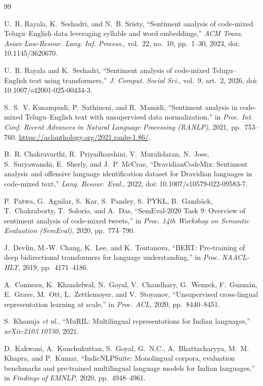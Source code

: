 \documentclass[10pt,journal]{IEEEtran}
\begin{document}
\begin{thebibliography}{99}

U.~R. Rayala, K.~Seshadri, and N.~B. Sristy, ``Sentiment analysis of code-mixed Telugu--English data leveraging syllable and word embeddings,'' \emph{ACM Trans. Asian Low-Resour. Lang. Inf. Process.}, vol.~22, no.~10, pp.~1--30, 2023, doi: 10.1145/3620670.

U.~R. Rayala and K.~Seshadri, ``Sentiment analysis of code-mixed Telugu--English text using transformers,'' \emph{J. Comput. Social Sci.}, vol.~9, art.~2, 2026, doi: 10.1007/s42001-025-00434-3.

S.~S.~V. Kusampudi, P.~Sathineni, and R.~Mamidi, ``Sentiment analysis in code-mixed Telugu--English text with unsupervised data normalization,'' in \emph{Proc. Int. Conf. Recent Advances in Natural Language Processing (RANLP)}, 2021, pp.~753--760. \url{https://aclanthology.org/2021.ranlp-1.86/}.

B.~R. Chakravarthi, R.~Priyadharshini, V.~Muralidaran, N.~Jose, S.~Suryawanshi, E.~Sherly, and J.~P. McCrae, ``DravidianCodeMix: Sentiment analysis and offensive language identification dataset for Dravidian languages in code-mixed text,'' \emph{Lang. Resour. Eval.}, 2022, doi: 10.1007/s10579-022-09583-7.

P.~Patwa, G.~Aguilar, S.~Kar, S.~Pandey, S.~PYKL, B.~Gamb\"ack, T.~Chakraborty, T.~Solorio, and A.~Das, ``SemEval-2020 Task 9: Overview of sentiment analysis of code-mixed tweets,'' in \emph{Proc. 14th Workshop on Semantic Evaluation (SemEval)}, 2020, pp.~774--790.

J.~Devlin, M.-W. Chang, K.~Lee, and K.~Toutanova, ``BERT: Pre-training of deep bidirectional transformers for language understanding,'' in \emph{Proc. NAACL-HLT}, 2019, pp.~4171--4186.

A.~Conneau, K.~Khandelwal, N.~Goyal, V.~Chaudhary, G.~Wenzek, F.~Guzm\'an, E.~Grave, M.~Ott, L.~Zettlemoyer, and V.~Stoyanov, ``Unsupervised cross-lingual representation learning at scale,'' in \emph{Proc. ACL}, 2020, pp.~8440--8451.

S.~Khanuja \emph{et al.}, ``MuRIL: Multilingual representations for Indian languages,'' \emph{arXiv:2103.10730}, 2021.

D.~Kakwani, A.~Kunchukuttan, S.~Goyal, G.~N.C., A.~Bhattacharyya, M.~M. Khapra, and P.~Kumar, ``IndicNLPSuite: Monolingual corpora, evaluation benchmarks and pre-trained multilingual language models for Indian languages,'' in \emph{Findings of EMNLP}, 2020, pp.~4948--4961.


\end{thebibliography}
\end{document}
